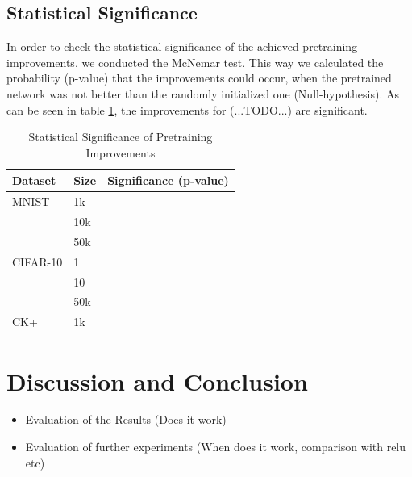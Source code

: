 \documentclass[draft]{article}
\begin{document}
  \subsection{Statistical Significance}
    In order to check the statistical significance of the achieved pretraining improvements, we conducted the McNemar test. This way we calculated the probability (p-value) that the improvements could occur, when the pretrained network was not better than the randomly initialized one (Null-hypothesis).
    As can be seen in table \ref{table:significance}, the improvements for (...TODO...) are significant.
    \begin{table}
      \caption{Statistical Significance of Pretraining Improvements}
      \label{table:significance}
      \centering
      \begin{tabular}{lll}
        \toprule
        Dataset     & Size     & Significance (p-value) \\
        \midrule
        MNIST & 1k  &     \\
        & 10k  &      \\
        & 50k  &     \\
        \midrule
        CIFAR-10     & 1 &     \\
        & 10 &      \\
        & 50k &      \\
        \midrule
        CK+     & 1k      &  \\
        \bottomrule
      \end{tabular}
    \end{table}


\section{Discussion and Conclusion}
  
  \begin{itemize}

    \item Evaluation of the Results         (Does it work)
    \item Evaluation of further experiments (When does it work, comparison with relu etc)

  \end{itemize}

\clearpage

\end{document}
